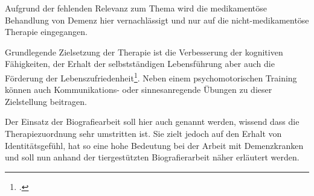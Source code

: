 Aufgrund der fehlenden Relevanz zum Thema wird die medikamentöse Behandlung von Demenz hier vernachlässigt und nur auf die nicht-medikamentöse Therapie eingegangen.

Grundlegende Zielsetzung der Therapie ist die Verbesserung der kognitiven Fähigkeiten, der Erhalt der selbstständigen Lebensführung aber auch die Förderung der Lebenszufriedenheit\footcite{Hegedusch2007}. Neben einem psychomotorischen Training können auch Kommunikations- oder sinnesanregende Übungen zu dieser Zielstellung beitragen. 

Der Einsatz der Biografiearbeit soll hier auch genannt werden, wissend dass die Therapiezuordnung sehr umstritten ist. Sie zielt jedoch auf den Erhalt von Identitätsgefühl, hat so eine hohe Bedeutung bei der Arbeit mit Demenzkranken und soll nun anhand der tiergestützten Biografierarbeit näher erläutert werden.
